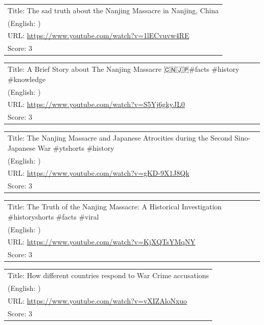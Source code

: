 \documentclass{article}
\begin{document}
\noindent
\begin{tabular}{p{}}
Title: The sad truth about the Nanjing Massacre in Nanjing, China \\
(English: ) \\
URL: \url{https://www.youtube.com/watch?v=1lECvuvw4RE} \\
Score: 3 \\
\end{tabular}
\vspace{0.5em}

\noindent
\begin{tabular}{p{}}
Title: A Brief Story about The Nanjing Massacre 🇨🇳🇯🇵\#facts \#history \#knowledge \\
(English: ) \\
URL: \url{https://www.youtube.com/watch?v=S5Yj6gkyJL0} \\
Score: 3 \\
\end{tabular}
\vspace{0.5em}

\noindent
\begin{tabular}{p{}}
Title: The Nanjing Massacre and Japanese Atrocities during the Second Sino-Japanese War \#ytshorts \#history \\
(English: ) \\
URL: \url{https://www.youtube.com/watch?v=gKD-9X1J8Qk} \\
Score: 3 \\
\end{tabular}
\vspace{0.5em}

\noindent
\begin{tabular}{p{}}
Title: The Truth of the Nanjing Massacre: A Historical Investigation \#historyshorts \#facts \#viral \\
(English: ) \\
URL: \url{https://www.youtube.com/watch?v=KjXQTsYMqNY} \\
Score: 3 \\
\end{tabular}
\vspace{0.5em}

\noindent
\begin{tabular}{p{}}
Title: How different countries respond to War Crime accusations \\
(English: ) \\
URL: \url{https://www.youtube.com/watch?v=vXIZAloNxuo} \\
Score: 3 \\
\end{tabular}
\vspace{0.5em}
\end{document}
